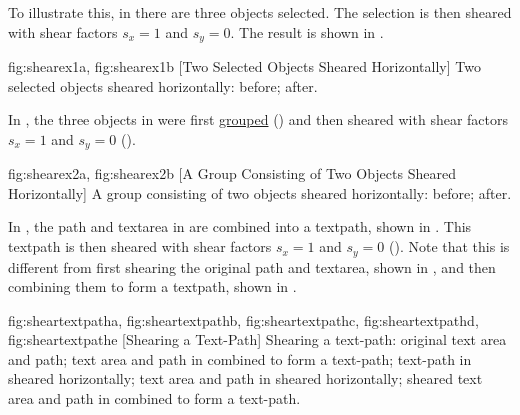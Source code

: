 To illustrate this, in  there are three
\glspl*{object} selected.  The selection is then sheared with shear
factors $s_x=1$ and $s_y=0$.  The result is shown in
.

{
 {fig:shearex1a}{}{},
 {fig:shearex1b}{}{}
}
[Two Selected Objects Sheared Horizontally]
{Two selected objects sheared horizontally:
 before;
 after.}

In , the three objects in
 were first \hyperref[sec:grouping]{grouped}
() and then sheared with shear factors
$s_x=1$ and $s_y=0$ ().

{
 {fig:shearex2a}{}{},
 {fig:shearex2b}{}{}
}
[A Group Consisting of Two Objects Sheared Horizontally]
{A group consisting of two objects sheared horizontally:
 before;
 after.}

In , the \gls*{path} and
\gls*{textarea} in  are combined into
a \gls*{textpath}, shown in . This
\gls*{textpath} is then sheared with shear factors $s_x=1$ and
$s_y=0$ (). Note that this is
different from first shearing the original \gls*{path} and
\gls*{textarea}, shown in , and then
combining them to form a \gls*{textpath}, shown in
.

{
 {fig:sheartextpatha}{}{},
 {fig:sheartextpathb}{}{},
 {fig:sheartextpathc}{}{},
 {fig:sheartextpathd}{}{},
 {fig:sheartextpathe}{}{}
}
[Shearing a Text-Path]
{Shearing a text-path:
 original text area and path; 
 text area and path 
in  combined to form a text-path; 
 text-path 
in  sheared horizontally; 
 text area and path 
in  sheared horizontally; 
 sheared text area and path 
in  combined to form a text-path.}

